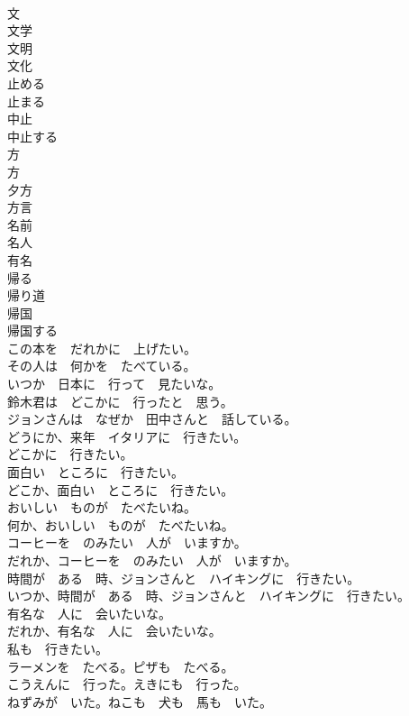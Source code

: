 \documentclass[8pt]{extreport}
\begin{document}
\begin{CJK}{UTF8}{min}
\\	文	
\\	文学	
\\	文明	
\\	文化	
\\	止める	
\\	止まる	
\\	中止	
\\	中止する	
\\	方	
\\	方	
\\	夕方	
\\	方言	
\\	名前	
\\	名人	
\\	有名	
\\	帰る	
\\	帰り道	
\\	帰国	
\\	帰国する	
\\	この本を　だれかに　上げたい。	
\\	その人は　何かを　たべている。	
\\	いつか　日本に　行って　見たいな。	
\\	鈴木君は　どこかに　行ったと　思う。	
\\	ジョンさんは　なぜか　田中さんと　話している。	
\\	どうにか、来年　イタリアに　行きたい。	
\\	どこかに　行きたい。	
\\	面白い　ところに　行きたい。	
\\	どこか、面白い　ところに　行きたい。	
\\	おいしい　ものが　たべたいね。	
\\	何か、おいしい　ものが　たべたいね。	
\\	コーヒーを　のみたい　人が　いますか。	
\\	だれか、コーヒーを　のみたい　人が　いますか。	
\\	時間が　ある　時、ジョンさんと　ハイキングに　行きたい。	
\\	いつか、時間が　ある　時、ジョンさんと　ハイキングに　行きたい。	
\\	有名な　人に　会いたいな。	
\\	だれか、有名な　人に　会いたいな。	
\\	私も　行きたい。	
\\	ラーメンを　たべる。ピザも　たべる。	
\\	こうえんに　行った。えきにも　行った。	
\\	ねずみが　いた。ねこも　犬も　馬も　いた。	

\end{CJK}
\end{document}
